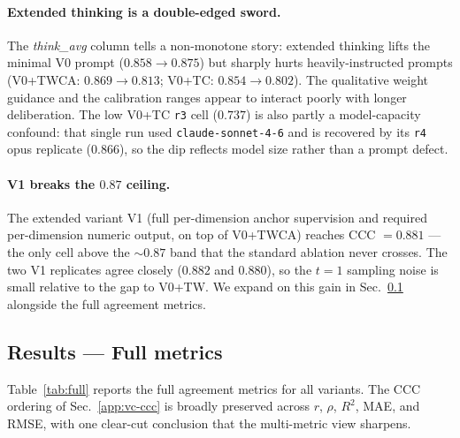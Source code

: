 \paragraph{Extended thinking is a double-edged sword.}
The \emph{think\_avg} column tells a non-monotone story: extended
thinking lifts the minimal V0 prompt ($0.858 \to 0.875$) but sharply
hurts heavily-instructed prompts (V0+TWCA: $0.869 \to 0.813$;
V0+TC: $0.854 \to 0.802$). The qualitative weight guidance and the
calibration ranges appear to interact poorly with longer
deliberation. The low V0+TC \texttt{r3} cell ($0.737$) is also
partly a model-capacity confound: that single run used
\texttt{claude-sonnet-4-6} and is recovered by its \texttt{r4} opus
replicate ($0.866$), so the dip reflects model size rather than a
prompt defect.

\paragraph{V1 breaks the $0.87$ ceiling.}
The extended variant V1 (full per-dimension anchor supervision and
required per-dimension numeric output, on top of V0+TWCA) reaches
CCC $= 0.881$ --- the only cell above the $\sim\!0.87$ band that the
standard ablation never crosses. The two V1 replicates agree closely
($0.882$ and $0.880$), so the $t = 1$ sampling noise is small
relative to the gap to V0+TW. We expand on this gain in
Sec.~\ref{app:vc-full} alongside the full agreement metrics.

\subsection{Results --- Full metrics}
\label{app:vc-full}

Table~\ref{tab:full} reports the full agreement metrics for all
variants. The CCC ordering of Sec.~\ref{app:vc-ccc} is broadly
preserved across $r$, $\rho$, $R^2$, MAE, and RMSE, with one
clear-cut conclusion that the multi-metric view sharpens.

